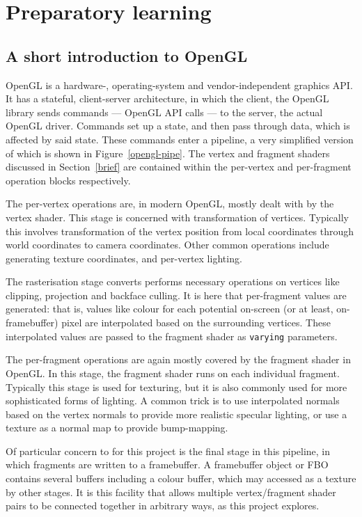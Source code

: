\documentclass[12pt,twoside,notitlepage]{report}
\begin{document}
\section{Preparatory learning}
\subsection{A short introduction to OpenGL}
OpenGL is a hardware-, operating-system and vendor-independent graphics API. It has a stateful, client-server architecture, in which the client, the OpenGL library sends commands --- OpenGL API calls --- to the server, the actual OpenGL driver. Commands set up a state, and then pass through data, which is affected by said state. These commands enter a pipeline, a very simplified version of which is shown in Figure~\ref{opengl-pipe}. The vertex and fragment shaders discussed in Section~\ref{brief} are contained within the per-vertex and per-fragment operation blocks respectively. 

The per-vertex operations are, in modern OpenGL, mostly dealt with by the vertex shader. This stage is concerned with transformation of vertices. Typically this involves transformation of the vertex position from local coordinates through world coordinates to camera coordinates. Other common operations include generating texture coordinates, and per-vertex lighting.

The rasterisation stage converts performs necessary operations on vertices like clipping, projection and backface culling. It is here that per-fragment values are generated: that is, values like colour for each potential on-screen (or at least, on-framebuffer) pixel are interpolated based on the surrounding vertices. These interpolated values are passed to the fragment shader as \texttt{varying} parameters.

The per-fragment operations are again mostly covered by the fragment shader in OpenGL. In this stage, the fragment shader runs on each individual fragment. Typically this stage is used for texturing, but it is also commonly used for more sophisticated forms of lighting. A common trick is to use interpolated normals based on the vertex normals to provide more realistic specular lighting, or use a texture as a normal map to provide bump-mapping.

Of particular concern to for this project is the final stage in this pipeline, in which fragments are written to a framebuffer. A framebuffer object or FBO contains several buffers including a colour buffer, which may accessed as a texture by other stages. It is this facility that allows multiple vertex/fragment shader pairs to be connected together in arbitrary ways, as this project explores.
\end{document}
